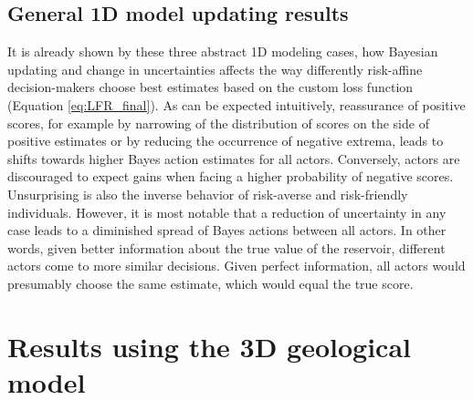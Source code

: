 			\subsection{General 1D model updating results}
			It is already shown by these three abstract 1D modeling cases, how Bayesian updating and change in uncertainties affects the way differently risk-affine decision-makers choose best estimates based on the custom loss function (Equation \ref{eq:LFR_final}). As can be expected intuitively, reassurance of positive scores, for example by narrowing of the distribution of scores on the side of positive estimates or by reducing the occurrence of negative extrema, leads to shifts towards higher Bayes action estimates for all actors. Conversely, actors are discouraged to expect gains when facing a higher probability of negative scores. Unsurprising is also the inverse behavior of risk-averse and risk-friendly individuals. However, it is most notable that a reduction of uncertainty in any case leads to a diminished spread of Bayes actions between all actors. In other words, given better information about the true value of the reservoir, different actors come to more similar decisions. Given perfect information, all actors would presumably choose the same estimate, which would equal the true score.
				
		\section{Results using the 3D geological model}
		